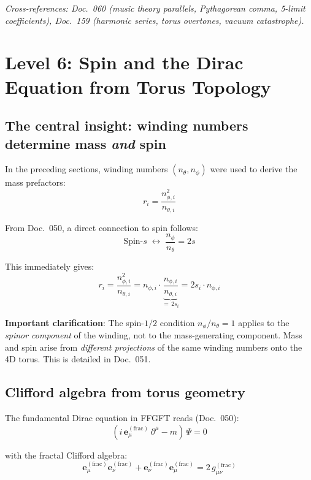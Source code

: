 \noindent\textit{Cross-references: Doc.~060 (music theory parallels,
Pythagorean comma, 5-limit coefficients),
Doc.~159 (harmonic series, torus overtones, vacuum catastrophe).}

\section{Level 6: Spin and the Dirac Equation from Torus Topology}

\subsection{The central insight: winding numbers determine mass \emph{and} spin}

In the preceding sections, winding numbers $(n_\theta, n_\phi)$ were
used to derive the mass prefactors:
\begin{equation}
    r_i = \frac{n_{\phi,i}^2}{n_{\theta,i}}
\end{equation}

From Doc.~050, a direct connection to spin follows:
\begin{equation}
    \text{Spin-}s \;\longleftrightarrow\; \frac{n_\phi}{n_\theta} = 2s
\end{equation}

This immediately gives:
\begin{equation}
    \boxed{r_i = \frac{n_{\phi,i}^2}{n_{\theta,i}}
    = n_{\phi,i} \cdot \underbrace{\frac{n_{\phi,i}}{n_{\theta,i}}}_{=\,2s_i}
    = 2 s_i \cdot n_{\phi,i}}
\end{equation}

\textbf{Important clarification}: The spin-$1/2$ condition
$n_\phi/n_\theta = 1$ applies to the \emph{spinor component} of the
winding, not to the mass-generating component. Mass and spin arise
from \emph{different projections} of the same winding numbers onto
the 4D torus. This is detailed in Doc.~051.

\subsection{Clifford algebra from torus geometry}

The fundamental Dirac equation in FFGFT reads (Doc.~050):
\begin{equation}
    (i\,\mathbf{e}_\mu^{(\mathrm{frac})}\,\partial^\mu - m)\,\Psi = 0
\end{equation}

with the fractal Clifford algebra:
\begin{equation}
    \mathbf{e}_\mu^{(\mathrm{frac})} \mathbf{e}_\nu^{(\mathrm{frac})}
    + \mathbf{e}_\nu^{(\mathrm{frac})} \mathbf{e}_\mu^{(\mathrm{frac})}
    = 2\,g_{\mu\nu}^{(\mathrm{frac})}
\end{equation}

